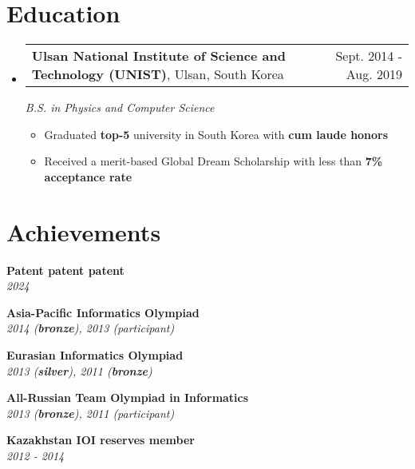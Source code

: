 \documentclass[letterpaper,11pt]{article}
\makeatletter
\newcommand{\resumeItem}[1]{
    \item\small{
            {#1 \vspace{-2pt}}
    }
}
\newcommand{\resumeSubheading}[4]{
    \vspace{-3pt}\item
    \begin{tabularx}{0.97\textwidth}[t]{l@{\extracolsep{\fill}}r}
    \textbf{#1}, #4 & #2 \\
    \end{tabularx}
    \textit{\small#3} \\
    \vspace{-7pt}
}
\newcommand{\resumeSubHeadingListStart}{\begin{itemize}[leftmargin=0.15in, label={}]}
\newcommand{\resumeSubHeadingListEnd}{\end{itemize}}
\newcommand{\resumeItemListStart}{\begin{itemize}}
\newcommand{\resumeItemListEnd}{\end{itemize}\vspace{-5pt}}
\makeatother
\begin{document}
\section{Education}
\resumeSubHeadingListStart
\resumeSubheading
{Ulsan National Institute of Science and Technology (UNIST)}{Sept. 2014 - Aug. 2019}
{B.S. in Physics and Computer Science}{Ulsan, South Korea}
\resumeItemListStart
\resumeItem{Graduated \textbf{top-5} university in South Korea with \textbf{cum laude honors}}
\resumeItem{Received a merit-based Global Dream Scholarship with less than \textbf{7\% acceptance rate}}
\resumeItemListEnd
\vspace{-6pt}
\resumeSubHeadingListEnd

\section{Achievements}
\parbox[t]{0.45\textwidth}{
    \begin{itemize}[leftmargin=0.15in, label={}]

    \vspace{-12pt}
    \small{\item{
    \textbf{Patent patent patent} \\
    \textit{2024} \\
    }}

    \vspace{-15pt}
    \small{\item{
    \textbf{Asia-Pacific Informatics Olympiad} \\
    \textit{2014 (\textbf{bronze}), 2013 (participant)} \\
    }}

    \vspace{-15pt}
    \small{\item{
    \textbf{Eurasian Informatics Olympiad} \\
    \textit{2013 (\textbf{silver}), 2011 (\textbf{bronze})} \\
    }}

    \end{itemize}
}
\parbox[t]{0.45\textwidth}{
    \begin{itemize}[leftmargin=0.15in, label={}]

        \vspace{-12pt}
        \small{\item{
        \textbf{All-Russian Team Olympiad in Informatics} \\
        \textit{2013 (\textbf{bronze}), 2011 (participant)} \\
        }}

        \vspace{-15pt}
        \small{\item{
        \textbf{Kazakhstan IOI reserves member} \\
        \textit{2012 - 2014} \\
        }}

    \end{itemize}
}

\end{document}
